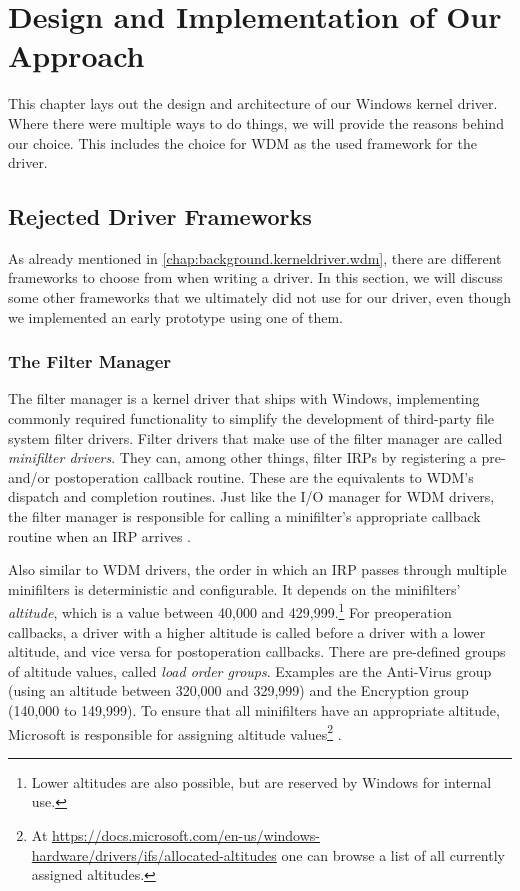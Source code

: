 \chapter{Design and Implementation of Our Approach}
\label{chap:ourapproach}
This chapter lays out the design and architecture of our Windows kernel driver. Where there were multiple ways to do things, we will provide the reasons behind our choice. This includes the choice for WDM as the used framework for the driver.

\section{Rejected Driver Frameworks}
\label{chap:ourapproach.rejected}
As already mentioned in \autoref{chap:background.kerneldriver.wdm}, there are different frameworks to choose from when writing a driver. In this section, we will discuss some other frameworks that we ultimately did not use for our driver, even though we implemented an early prototype using one of them.

\subsection{The Filter Manager}
\label{chap:ourapproach.rejected.fltmgr}
The filter manager is a kernel driver that ships with Windows, implementing commonly required functionality to simplify the development of third-party file system filter drivers. Filter drivers that make use of the filter manager are called \emph{minifilter drivers}. They can, among other things, filter IRPs by registering a pre- and/or postoperation callback routine. These are the equivalents to WDM's dispatch and completion routines. Just like the I/O manager for WDM drivers, the filter manager is responsible for calling a minifilter's appropriate callback routine when an IRP arrives \cite{Fltmgr}.

Also similar to WDM drivers, the order in which an IRP passes through multiple minifilters is deterministic and configurable. It depends on the minifilters' \emph{altitude}, which is a value between 40,000 and 429,999.\footnote{\label{fn:ourapproach.rejected.altitudevalues} Lower altitudes are also possible, but are reserved by Windows for internal use.} For preoperation callbacks, a driver with a higher altitude is called before a driver with a lower altitude, and vice versa for postoperation callbacks. There are pre-defined groups of altitude values, called \emph{load order groups}. Examples are the Anti-Virus group (using an altitude between 320,000 and 329,999) and the Encryption group (140,000 to 149,999). To ensure that all minifilters have an appropriate altitude, Microsoft is responsible for assigning altitude values\footnote{\label{fn:ourapproach.rejected.assignedaltitudes} At \url{https://docs.microsoft.com/en-us/windows-hardware/drivers/ifs/allocated-altitudes} one can browse a list of all currently assigned altitudes.} \cite{Fltmgr}.

